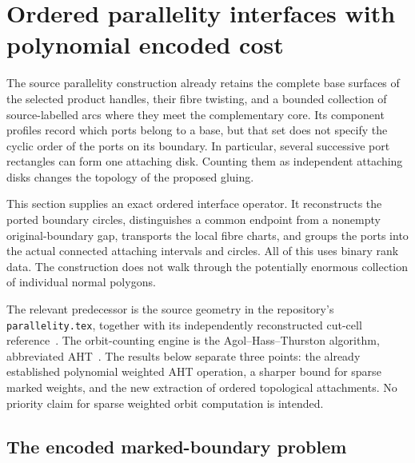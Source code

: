 \section{Ordered parallelity interfaces with polynomial encoded cost}
\label{int:section}

The source parallelity construction already retains the complete base surfaces
of the selected product handles, their fibre twisting, and a bounded collection
of source-labelled arcs where they meet the complementary core.  Its component
profiles record which ports belong to a base, but that set does not specify the
cyclic order of the ports on its boundary.  In particular, several successive
port rectangles can form one attaching disk.  Counting them as independent
attaching disks changes the topology of the proposed gluing.

This section supplies an exact ordered interface operator.  It reconstructs
the ported boundary circles, distinguishes a common endpoint from a nonempty
original-boundary gap, transports the local fibre charts, and groups the ports
into the actual connected attaching intervals and circles.  All of this uses
binary rank data.  The construction does not walk through the potentially
enormous collection of individual normal polygons.

The relevant predecessor is the source geometry in the repository's
\texttt{parallelity.tex}, together with its independently reconstructed
cut-cell reference~\cite{ProveIt2026}.  The orbit-counting engine is the
Agol--Hass--Thurston algorithm, abbreviated AHT~\cite{AHT2006}.  The results below
separate three points: the already established polynomial weighted AHT
operation, a sharper bound for sparse marked weights, and the new extraction
of ordered topological attachments.  No priority claim for sparse weighted
orbit computation is intended.

\subsection{The encoded marked-boundary problem}
\label{int:model}

